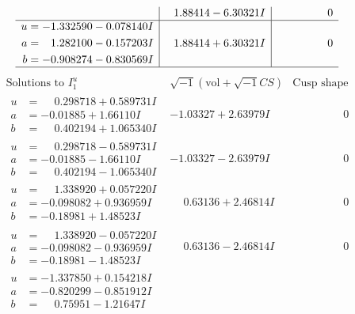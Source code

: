 \documentclass[1p]{elsarticle_modified}
\theoremstyle{definition}
\newcommand{\I}{\sqrt{-1}}
\begin{document}
$$\begin{array}{c|c|c}
 & \phantom{-}1.88414 - 6.30321 I & \phantom{-0.000000 } 0 \\ \hline\begin{aligned}
u &= -1.332590 - 0.078140 I \\
a &= \phantom{-}1.282100 - 0.157203 I \\
b &= -0.908274 - 0.830569 I\end{aligned}
 & \phantom{-}1.88414 + 6.30321 I & \phantom{-0.000000 } 0\\
 \hline 
 \end{array}$$\newpage$$\begin{array}{c|c|c}  
\text{Solutions to }I^u_{1}& \I (\text{vol} + \sqrt{-1}CS) & \text{Cusp shape}\\
 \hline 
\begin{aligned}
u &= \phantom{-}0.298718 + 0.589731 I \\
a &= -0.01885 + 1.66110 I \\
b &= \phantom{-}0.402194 + 1.065340 I\end{aligned}
 & -1.03327 + 2.63979 I & \phantom{-0.000000 } 0 \\ \hline\begin{aligned}
u &= \phantom{-}0.298718 - 0.589731 I \\
a &= -0.01885 - 1.66110 I \\
b &= \phantom{-}0.402194 - 1.065340 I\end{aligned}
 & -1.03327 - 2.63979 I & \phantom{-0.000000 } 0 \\ \hline\begin{aligned}
u &= \phantom{-}1.338920 + 0.057220 I \\
a &= -0.098082 + 0.936959 I \\
b &= -0.18981 + 1.48523 I\end{aligned}
 & \phantom{-}0.63136 + 2.46814 I & \phantom{-0.000000 } 0 \\ \hline\begin{aligned}
u &= \phantom{-}1.338920 - 0.057220 I \\
a &= -0.098082 - 0.936959 I \\
b &= -0.18981 - 1.48523 I\end{aligned}
 & \phantom{-}0.63136 - 2.46814 I & \phantom{-0.000000 } 0 \\ \hline\begin{aligned}
u &= -1.337850 + 0.154218 I \\
a &= -0.820299 - 0.851912 I \\
b &= \phantom{-}0.75951 - 1.21647 I\end{aligned}

\end{array}$$
\end{document}
